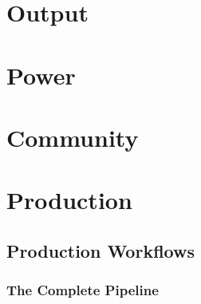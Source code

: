 \documentclass[11pt,letterpaper,twoside,openright]{book}
\begin{document}
\part{Output}





\part{Power}





\part{Community}





\part{Production}

\chapter{Production Workflows}
\label{ch:production}

\section{The Complete Pipeline}
\end{document}
